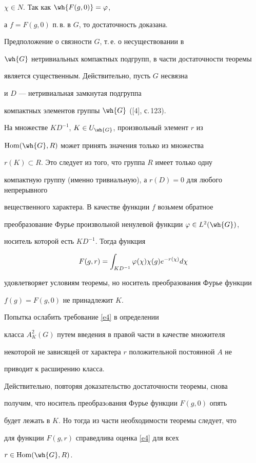 $\chi\in N$. Так как $\wh{F(g,0)}=\vp$,


а $f=F(g,0)$ п.\,в. в $G$, то достаточность доказана.





\begin{note}


Предположение о связности $G$, т.\,е. о несуществовании в 


$\wh{G}$ нетривиальных компактных подгрупп, в части достаточности теоремы 


является существенным. Действительно, пусть $G$ несвязна


и $D$ --- нетривиальная замкнутая подгруппа 


компактных элементов группы $\wh{G}$ ([4], с.\,123).


На множестве $KD^{-1}$, $K\in U_{\wh{G}}$, произвольный элемент $r$ из 


$\mh(\wh{G},R)$ может принять значения только из множества


$r(K)\subset R$. Это следует из того, что группа $R$ имеет только одну 


компактную группу (именно тривиальную), а $r(D)=0$ для любого непрерывного 


вещественного характера. В качестве функции $f$ возьмем обратное 


преобразование Фурье произвольной ненулевой функции $\vp\in L^2(\wh{G})$, 


носитель которой есть $KD^{-1}$. Тогда функция 


$$


F(g,r)=\int_{KD^{-1}}\vp(\chi)\chi(g)e^{-r(\chi)}d\chi


$$


удовлетворяет условиям теоремы, но носитель преобразования Фурье функции 


$f(g)=F(g,0)$ не принадлежит $K$.


\end{note}





\begin{note}


Попытка ослабить требование \eqref{e4} в определении 


класса $A^2_K(G)$ путем введения в правой части в качестве множителя 


некоторой не зависящей от характера $r$ положительной постоянной $A$ не 


приводит к расширению класса. 


Действительно, повторяя доказательство достаточности теоремы, снова


получим, что носитель преобразoвания Фурье функции $F(g,0)$ опять 


будет лежать в $K$. Но тогда из части необходимости теоремы следует, что


для функции $F(g,r)$ справедлива оценка \eqref{e4} для всех 


$r\in\mh(\wh{G},R)$.


\end{note}





